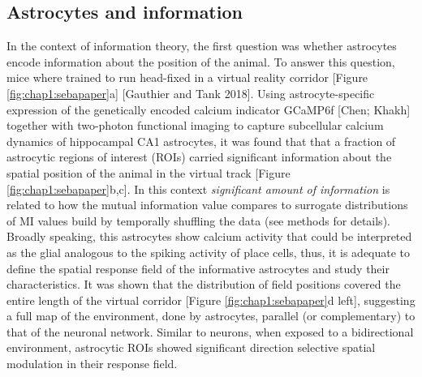 \subsection{Astrocytes and information}
\label{chap1:sec:3:subsec1:astro_info}
In the context of information theory, the first question was whether astrocytes encode information about the position of the animal.
To answer this question, mice where trained to run head-fixed in a virtual reality corridor [Figure \ref{fig:chap1:sebapaper}a] [Gauthier and Tank 2018].
Using astrocyte-specific expression of the genetically encoded calcium indicator GCaMP6f [Chen; Khakh] together with two-photon functional imaging to capture subcellular calcium dynamics of hippocampal CA1 astrocytes, it was found that that a fraction of astrocytic regions of interest (ROIs) carried significant information about the spatial position of the animal in the virtual track [Figure \ref{fig:chap1:sebapaper}b,c].
In this context \textit{significant amount of information} is related to how the mutual information value compares to surrogate distributions of MI values build by temporally shuffling the data (see methods for details). 
Broadly speaking, this astrocytes show calcium activity that could be interpreted as the glial analogous to the spiking activity of place cells, thus, it is adequate to define the spatial response field of the informative astrocytes and study their characteristics.
It was shown that the distribution of field positions covered the entire length of the virtual corridor [Figure \ref{fig:chap1:sebapaper}d left], suggesting a full map of the environment, done by astrocytes, parallel (or complementary) to that of the neuronal network.
Similar to neurons, when exposed to a bidirectional environment, astrocytic ROIs showed significant direction selective spatial modulation in their response field.

